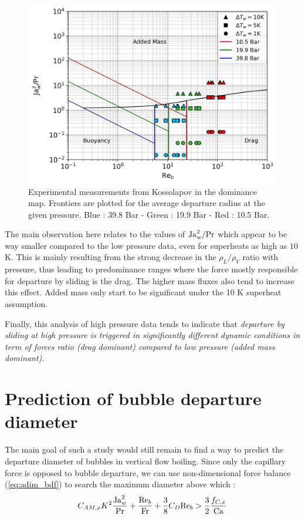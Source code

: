 \begin{figure}[!htb]
\vspace{16pt}
\centering
\includegraphics[width=0.6\linewidth]{img/forces/Koss_HP.png}
\caption{Experimental measurements from Kossolapov in the dominance map. Frontiers are plotted for the average departure radius at the given pressure. Blue : 39.8 Bar - Green : 19.9 Bar - Red : 10.5 Bar.}
\label{fig:koss_map}
\vspace{16pt}
\end{figure}

The main observation here relates to the values of $\mathrm{Ja}_{w}^{2}/\mathrm{Pr}$ which appear to be way smaller compared to the low pressure data, even for superheats as high as $10$K. This is mainly resulting from the strong decrease in the $\rho_{L}/\rho_{V}$ ratio with pressure, thus leading to predominance ranges where the force mostly responsible for departure by sliding is the drag. The higher mass fluxes also tend to increase this effect. Added mass only start to be significant under the 10 K superheat assumption.

Finally, this analysis of high pressure data tends to indicate that \emph{departure by sliding at high pressure is triggered in significantly different dynamic conditions in term of forces ratio (drag dominant) compared to low pressure (added mass dominant)}.

\section{Prediction of bubble departure diameter}
\label{sec:dd_pred}

The main goal of such a study would still remain to find a way to predict the departure diameter of bubbles in vertical flow boiling. Since only the capillary force is opposed to bubble departure, we can use non-dimensional force balance (\ref{eq:adim_bdf}) to search the maximum diameter above which :
\begin{equation}
 C_{AM,x}K^{2}\frac{\mathrm{Ja}_{w}^{2}}{\mathrm{Pr}}+\frac{\mathrm{Re}_{b}}{\mathrm{Fr}} + \frac{3}{8}C_{D}\mathrm{Re}_{b} > \frac{3}{2}\frac{f_{C,x}}{\mathrm{Ca}}
\label{eq:adim_dd}
\end{equation}

